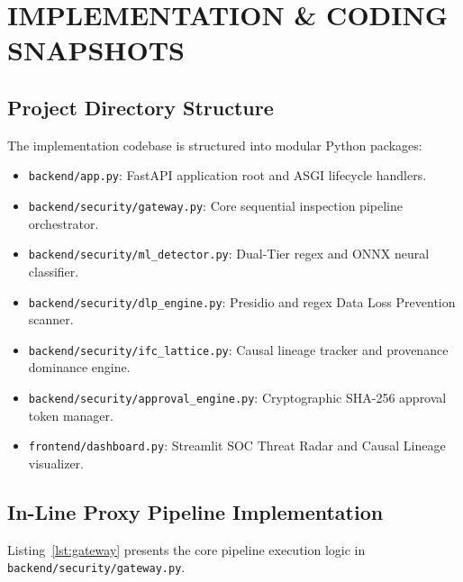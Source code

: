 \chapter{IMPLEMENTATION \& CODING SNAPSHOTS}

\section{Project Directory Structure}
The implementation codebase is structured into modular Python packages:
\begin{itemize}
    \item \texttt{backend/app.py}: FastAPI application root and ASGI lifecycle handlers.
    \item \texttt{backend/security/gateway.py}: Core sequential inspection pipeline orchestrator.
    \item \texttt{backend/security/ml\_detector.py}: Dual-Tier regex and ONNX neural classifier.
    \item \texttt{backend/security/dlp\_engine.py}: Presidio and regex Data Loss Prevention scanner.
    \item \texttt{backend/security/ifc\_lattice.py}: Causal lineage tracker and provenance dominance engine.
    \item \texttt{backend/security/approval\_engine.py}: Cryptographic SHA-256 approval token manager.
    \item \texttt{frontend/dashboard.py}: Streamlit SOC Threat Radar and Causal Lineage visualizer.
\end{itemize}

\section{In-Line Proxy Pipeline Implementation}
Listing~\ref{lst:gateway} presents the core pipeline execution logic in \texttt{backend/security/gateway.py}.

